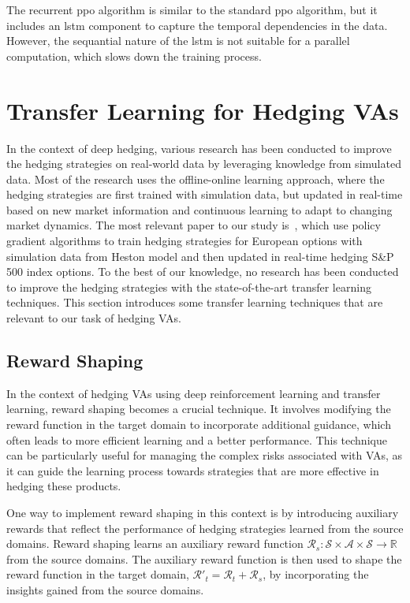 The recurrent \gls{ppo} algorithm is similar to the standard \gls{ppo} algorithm, but it includes an \gls{lstm} component to capture the temporal dependencies in the data.
However, the sequantial nature of the \gls{lstm} is not suitable for a parallel computation, which slows down the training process.

\section{Transfer Learning for Hedging VAs} \label{sec:TransferLearning}

In the context of deep hedging, various research has been conducted to improve the hedging strategies on real-world data by leveraging knowledge from simulated data.
Most of the research uses the offline-online learning approach, where the hedging strategies are first trained with simulation data, but updated in real-time based on new market information and continuous learning to adapt to changing market dynamics.
The most relevant paper to our study is~\cite{xiao2021optimal}, which use policy gradient algorithms to train hedging strategies for European options with simulation data from Heston model and then updated in real-time hedging S\&P 500 index options.
To the best of our knowledge, no research has been conducted to improve the hedging strategies with the state-of-the-art transfer learning techniques.
This section introduces some transfer learning techniques that are relevant to our task of hedging VAs.

\subsection{Reward Shaping}

In the context of hedging VAs using deep reinforcement learning and transfer learning, reward shaping becomes a crucial technique. 
It involves modifying the reward function in the target domain to incorporate additional guidance, which often leads to more efficient learning and a better performance.
This technique can be particularly useful for managing the complex risks associated with VAs, as it can guide the learning process towards strategies that are more effective in hedging these products.

One way to implement reward shaping in this context is by introducing auxiliary rewards that reflect the performance of hedging strategies learned from the source domains.
Reward shaping learns an auxiliary reward function $\mathcal{R}_s: \mathcal{S} \times \mathcal{A} \times \mathcal{S} \rightarrow \mathbb{R}$ from the source domains.
The auxiliary reward function is then used to shape the reward function in the target domain, $\mathcal{R}'_t = \mathcal{R}_t + \mathcal{R}_s$, by incorporating the insights gained from the source domains.

